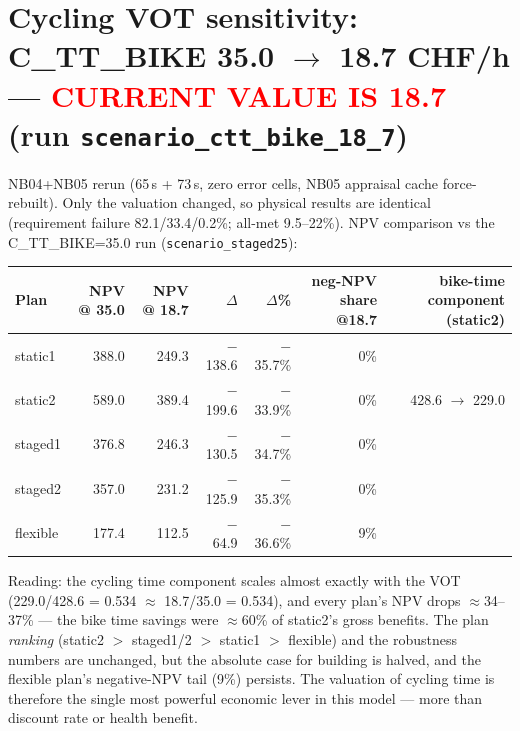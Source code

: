 \documentclass[10pt,a4paper]{article}
\begin{document}
\section{Cycling VOT sensitivity: C\_TT\_BIKE 35.0 $\to$ 18.7 CHF/h --- \textcolor{red}{CURRENT VALUE IS 18.7} (run \texttt{scenario\_ctt\_bike\_18\_7})}
\medskip

NB04+NB05 rerun (65\,s + 73\,s, zero error cells, NB05 appraisal cache force-rebuilt). Only the
valuation changed, so physical results are identical (requirement failure 82.1/33.4/0.2\%;
all-met 9.5--22\%). NPV comparison vs the C\_TT\_BIKE=35.0 run (\texttt{scenario\_staged25}):

\begin{tabular}{@{}lrrrrrr@{}}
\toprule
Plan & NPV @ 35.0 & NPV @ 18.7 & $\Delta$ & $\Delta$\% & neg-NPV share @18.7 & bike-time component (static2) \\
\midrule
static1 & 388.0 & 249.3 & $-$138.6 & $-$35.7\% & 0\% & \\
static2 & 589.0 & 389.4 & $-$199.6 & $-$33.9\% & 0\% & 428.6 $\to$ 229.0 \\
staged1 & 376.8 & 246.3 & $-$130.5 & $-$34.7\% & 0\% & \\
staged2 & 357.0 & 231.2 & $-$125.9 & $-$35.3\% & 0\% & \\
flexible & 177.4 & 112.5 & $-$64.9 & $-$36.6\% & 9\% & \\
\bottomrule
\end{tabular}

Reading: the cycling time component scales almost exactly with the VOT (229.0/428.6 =
0.534 $\approx$ 18.7/35.0 = 0.534), and every plan's NPV drops $\approx$34--37\% --- the bike
time savings were $\approx$60\% of static2's gross benefits. The plan \emph{ranking} (static2
$>$ staged1/2 $>$ static1 $>$ flexible) and the robustness numbers are unchanged, but the
absolute case for building is halved, and the flexible plan's negative-NPV tail (9\%)
persists. The valuation of cycling time is therefore the single most powerful economic
lever in this model --- more than discount rate or health benefit.
\end{document}
